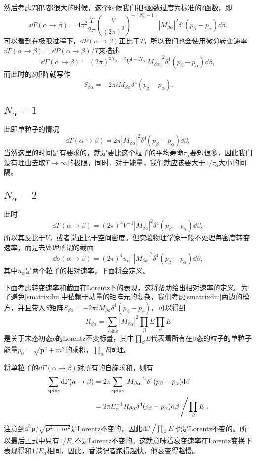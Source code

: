 \documentclass[9pt]{extbook}
\begin{document}
然后考虑$T$和$V$都很大的时候，这个时候我们把$\delta$函数过度为标准的$\delta$函数，即
\[
	\dd P(\alpha\to\beta)=4\pi^2\frac{T}{2\pi}\left(\frac{V}{(2\pi)^3}\right)^{-(N_\alpha-1)}\left|M_{\beta\alpha}\right|^2\delta^4(p_\beta-p_\alpha)\dd \beta.
\]
可以看到在极限过程下，$\dd P(\alpha\to\beta)$正比于$T$，所以我们也会使用微分转变速率$\dd \Gamma(\alpha\to\beta)=\dd P(\alpha\to\beta)/T$来描述
\[
	\dd \Gamma (\alpha\to\beta)=(2\pi)^{3N_\alpha-2}V^{1-N_\alpha}\left|M_{\beta\alpha}\right|^2\delta^4(p_\beta-p_\alpha)\dd \beta,
\]
而此时的$S$矩阵就写作
\[
S_{\beta\alpha}=-2\pi iM_{\beta\alpha}\delta^4(p_\beta-p_\alpha).
\]
\subsection*{$N_\alpha=1$}
此即单粒子的情况
\[
	\dd \Gamma (\alpha\to\beta)=2\pi\left|M_{\beta\alpha}\right|^2\delta^4(p_\beta-p_\alpha)\dd \beta,
\]
当然这里的时间是有要求的，就是要比这个粒子的平均寿命$\tau_\alpha$要短很多，因此我们没有理由去取$T\to \infty$的极限，同时，对于能量，我们就应该要大于$1/\tau_\alpha$大小的间隔。
\subsection*{$N_\alpha=2$}
此时
\[
	\dd \Gamma (\alpha\to\beta)=(2\pi)^{4}V^{-1}\left|M_{\beta\alpha}\right|^2\delta^4(p_\beta-p_\alpha)\dd \beta,
\]
所以其反比于$V$，或者说正比于空间密度。但实验物理学家一般不处理每密度转变速率，而是去处理所谓的截面
\[
	\dd \sigma (\alpha\to\beta)=(2\pi)^{4}u_\alpha^{-1}\left|M_{\beta\alpha}\right|^2\delta^4(p_\beta-p_\alpha)\dd \beta,
\]
其中$u_\alpha$是两个粒子的相对速率，下面将会定义。

下面考虑转变速率和截面在Lorentz下的表现，这将帮助给出相对速率的定义。为了避免\eqref{smatrixdui}中依赖于动量的矩阵元的复杂，我们考虑\eqref{smatrixdui}两边的模方，并且带入$S$矩阵$S_{\beta\alpha}=-2\pi iM_{\beta\alpha}\delta^4(p_\beta-p_\alpha)$，可以得到
\[
	R_{\beta\alpha}=\sum_{\text{spins}}|M_{\beta\alpha}|^2\prod_\beta E\prod_\alpha E
\]
是关于末态初态$p$的Lorentz不变标量，其中$\prod_\beta E$代表着所有在$\beta$态的粒子的单粒子能量$p_0=\sqrt{\bm{p}^2+m^2}$的乘积，$\prod_\alpha E$同理。

将单粒子的$\dd \Gamma (\alpha\to\beta)$对所有的自旋求和，则有
\[
	\begin{split}
	\sum_{\text{spins}}\mathrm{d} \Gamma (\alpha\to\beta)&=
	2\pi\sum_{\text{spins}}\left|M_{\beta\alpha}\right|^2\delta^4(p_\beta-p_\alpha)\mathrm{d} \beta\\
	&=2\pi E^{-1}_\alpha R_{\beta\alpha}\delta^4(p_\beta-p_\alpha)\mathrm{d} \beta\left/\prod_\beta E\right..
	\end{split}
\]
注意到$\dd^3 \bm{p}/\sqrt{\bm{p}^2+m^2}$是Lorentz不变的，因此$\mathrm{d} \beta\left/\prod_\beta E\right.$也是Lorentz不变的。所以最后上式中只有$1/E_\alpha$不是Lorentz不变的。这就意味着衰变速率在Lorentz变换下表现得和$1/E_\alpha$相同，因此，香港记者跑得越快，他衰变得越慢。
\end{document}

